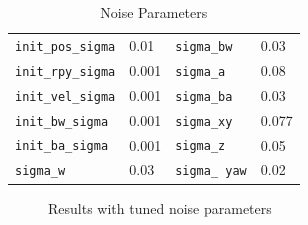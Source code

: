 \documentclass[letter, 10pt]{article}
\begin{document}
\begin{onehalfspacing}
\begin{table}[h]
	\centering	
	\caption{Noise Parameters}	\label{np}\vspace{-6pt}
	\begin{tabular}{llll} \toprule
	{\tt init\_pos\_sigma}    & 0.01    & {\tt sigma\_bw}           & 0.03      \\
	{\tt init\_rpy\_sigma}    & 0.001   &  {\tt sigma\_a}            & 0.08      \\
	{\tt init\_vel\_sigma}    & 0.001    &  {\tt sigma\_ba}           & 0.03    \\
	{\tt init\_bw\_sigma}    & 0.001    &  {\tt sigma\_xy}           & 0.077     \\
	{\tt init\_ba\_sigma}     & 0.001      &  {\tt sigma\_z}            & 0.05  \\
	{\tt sigma\_w}            & 0.03       & {\tt sigma\_ yaw}           & 0.02  \\ \bottomrule
	\end{tabular}
\end{table}

\begin{figure}[t]
	\centering
	\caption{Results with tuned noise parameters}
	\label{tuning}
\end{figure}


\end{onehalfspacing}
\end{document}

